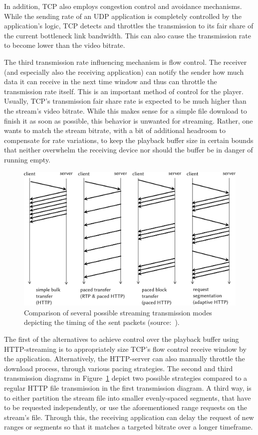 In addition, \gls{TCP} also employs congestion control and avoidance mechanisms. While the sending rate of an \gls{UDP} application is completely controlled by the application's logic, \gls{TCP} detects and throttles the transmission to its fair share of the current bottleneck link bandwidth. This can also cause the transmission rate to become lower than the video bitrate. 

The third transmission rate influencing mechanism is flow control. The receiver (and especially also the receiving application) can notify the sender how much data it can receive in the next time window and thus can throttle the transmission rate itself. This is an important method of control for the player. Usually, \gls{TCP}'s transmission fair share rate is expected to be much higher than the stream's video bitrate. While this makes sense for a simple file download to finish it as soon as possible, this behavior is unwanted for streaming. Rather, one wants to match the stream bitrate, with a bit of additional headroom to compensate for rate variations, to keep the playback buffer size in certain bounds that neither overwhelm the receiving device nor should the buffer be in danger of running empty. 

\begin{figure}[htbp]
	\centering
	\includegraphics[width=1.0\textwidth]{images/streaming-transfer-modes.pdf}
	\caption{Comparison of several possible streaming transmission modes depicting the timing of the sent packets (source:~\cite{ma2011mobile}).}
\label{c3:fig:streamingtransfermodes}
\end{figure}

The first of the alternatives to achieve control over the playback buffer using \gls{HTTP}-streaming is to appropriately size \gls{TCP}'s flow control receive window by the application. 
Alternatively, the \gls{HTTP}-server can also manually throttle the download process, through various pacing strategies. The second and third transmission diagrams in Figure~\ref{c3:fig:streamingtransfermodes} depict two possible strategies compared to a regular \gls{HTTP} file transmission in the first transmission diagram. A third way, is to either partition the stream file into smaller evenly-spaced segments, that have to be requested independently, or use the aforementioned range requests on the stream's file. Through this, the receiving application can delay the request of new ranges or segments so that it matches a targeted bitrate over a longer timeframe.

